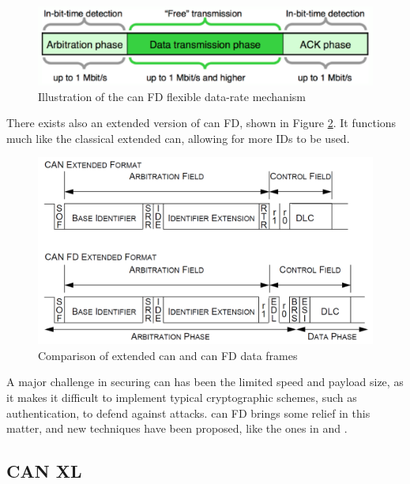 \begin{figure}
    \centering
    \includegraphics[width = \textwidth]{img/parts/introduction/CAN FD Bit Rates.png}
    \caption{Illustration of the \gls{can} FD flexible data-rate mechanism \citep{CANFD}}
    \label{fig:CANFD_BitRates}
\end{figure}

There exists also an extended version of \gls{can} FD, shown in Figure \ref{fig:CANFD_Extended}. It functions much like the classical extended \gls{can}, allowing for more IDs to be used.

\begin{figure}
    \centering
    \includegraphics[width = \textwidth]{img/parts/introduction/CAN FD Extended.png}
    \caption{Comparison of extended \gls{can} and \gls{can} FD data frames \citep{Bosch2012}}
    \label{fig:CANFD_Extended}
\end{figure}

A major challenge in securing \gls{can} has been the limited speed and payload size, as it makes it difficult to implement typical cryptographic schemes, such as authentication, to defend against attacks. \gls{can} FD brings some relief in this matter, and new techniques have been proposed, like the ones in \citep{Woo2016} and \citep{Agrawal2019}.

\subsection{CAN XL}

